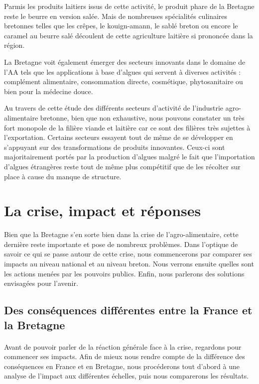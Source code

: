 \documentclass[a4paper,12pt]{report}
\begin{document}
			Parmis les produits laitiers issus de cette activité, le produit phare de la Bretagne reste le beurre en version salée. Mais de nombreuses spécialités culinaires bretonnes telles que les crêpes, le kouign-amann, le sablé breton ou encore le caramel au beurre salé découlent de cette agriculture laitière si prononcée dans la région.
			
			La Bretagne voit également émerger des secteurs innovants dans le domaine de l’AA tels que les applications à base d’algues qui servent à diverses activités\cite{CartesBretagneAgroAlimentaire20142016} : complément alimentaire, consommation directe, cosmétique, phytosanitaire ou bien pour la médecine douce.
			
			Au travers de cette étude des différents secteurs d’activité de l’industrie agro-alimentaire bretonne, bien que non exhaustive, nous pouvons constater un très fort monopole de la filière viande et laitière car ce sont des filières très sujettes à l’exportation. Certains secteurs essayent tout de même de se développer en s’appuyant sur des transformations de produits innovantes. Ceux-ci sont majoritairement portés par la production d’algues malgré le fait que l’importation d’algues étrangères reste tout de même plus compétitif que de les récolter sur place à cause du manque de structure.
			
			
	\section{La crise, impact et réponses}
		Bien que la Bretagne s’en sorte bien dans la crise de l’agro-alimentaire, cette dernière reste importante et pose de nombreux problèmes. Dans l’optique de savoir ce qui se passe autour de cette crise, nous commencerons par comparer ses impacts au niveau national et au niveau breton. Nous verrons ensuite quelles sont les actions menées par les pouvoirs publics. Enfin, nous parlerons des solutions envisagées pour l’avenir.
		
		\subsection{Des conséquences différentes entre la France et la Bretagne}
			\paragraph{}Avant de pouvoir parler de la réaction générale face à la crise, regardons pour commencer ses impacts. Afin de mieux nous rendre compte de la différence des conséquences en France et en Bretagne, nous procéderons tout d'abord à une analyse de l'impact aux différentes échelles, puis nous comparerons les résultats.
\end{document}
